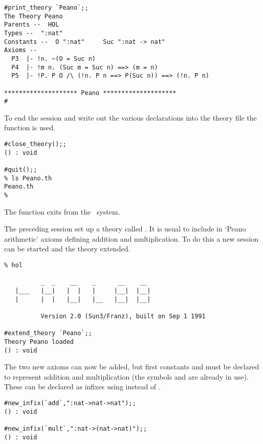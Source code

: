 \begin{session}\begin{verbatim}
#print_theory `Peano`;;
The Theory Peano
Parents --  HOL
Types --  ":nat"
Constants --  O ":nat"     Suc ":nat -> nat"
Axioms --
  P3  |- !n. ~(O = Suc n)
  P4  |- !m n. (Suc m = Suc n) ==> (m = n)
  P5  |- !P. P O /\ (!n. P n ==> P(Suc n)) ==> (!n. P n)

******************** Peano ********************
#\end{verbatim}\end{session}

To end the session and write out the various declarations into the theory file
 the function  is used.

\begin{session}\begin{verbatim}
#close_theory();;
() : void

#quit();;
% ls Peano.th
Peano.th
%
\end{verbatim}\end{session}

\noindent The function  exits from the \HOL\ system.

The preceding session set up a theory called . It is usual
to include in `Peano arithmetic' axioms defining addition and multiplication.
To do this a new session can be started and the theory extended.

\begin{session}\begin{verbatim}
% hol

          _  _    __    _      __    __
   |___   |__|   |  |   |     |__|  |__|
   |      |  |   |__|   |__   |__|  |__|

          Version 2.0 (Sun3/Franz), built on Sep 1 1991

#extend_theory `Peano`;;
Theory Peano loaded
() : void
\end{verbatim}\end{session}

\noindent The two new axioms can now be added, but first constants  and
 must  be  declared  to  represent  addition  and  multiplication (the
symbols \ml{+}  and  \ml{*}  are  already in  use).   These can  be declared as
infixes using  instead of .

\begin{session}\begin{verbatim}
#new_infix(`add`,":nat->nat->nat");;
() : void

#new_infix(`mult`,":nat->(nat->nat)");;
() : void
\end{verbatim}\end{session}

